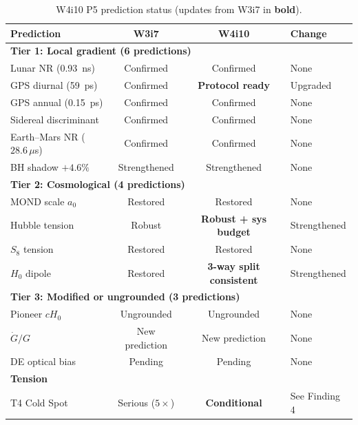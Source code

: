 \documentclass[11pt,a4paper]{article}
\newcommand{\Hzero}{H_0}
\newcommand{\aM}{a_0}
\begin{document}
\begin{table}[H]
\centering
\caption{W4i10 P5 prediction status (updates from W3i7 in \textbf{bold}).}
\begin{tabular}{p{3.5cm}ccl}
\toprule
\textbf{Prediction} & \textbf{W3i7} & \textbf{W4i10} & \textbf{Change} \\
\midrule
\multicolumn{4}{l}{\textbf{Tier 1: Local gradient (6 predictions)}} \\
\midrule
Lunar NR (0.93~ns) & Confirmed & Confirmed & None \\
GPS diurnal (59~ps) & Confirmed & \textbf{Protocol ready} & Upgraded \\
GPS annual (0.15~ps) & Confirmed & Confirmed & None \\
Sidereal discriminant & Confirmed & Confirmed & None \\
Earth--Mars NR ($28.6\,\mu$s) & Confirmed & Confirmed & None \\
BH shadow $+4.6\%$ & Strengthened & Strengthened & None \\
\midrule
\multicolumn{4}{l}{\textbf{Tier 2: Cosmological (4 predictions)}} \\
\midrule
MOND scale $\aM$ & Restored & Restored & None \\
Hubble tension & Robust & \textbf{Robust + sys budget} & Strengthened \\
$S_8$ tension & Restored & Restored & None \\
$\Hzero$ dipole & Restored & \textbf{3-way split consistent} & Strengthened \\
\midrule
\multicolumn{4}{l}{\textbf{Tier 3: Modified or ungrounded (3 predictions)}} \\
\midrule
Pioneer $c\Hzero$ & Ungrounded & Ungrounded & None \\
$\dot{G}/G$ & New prediction & New prediction & None \\
DE optical bias & Pending & Pending & None \\
\midrule
\multicolumn{4}{l}{\textbf{Tension}} \\
\midrule
T4 Cold Spot & Serious ($5\times$) & \textbf{Conditional} & See Finding 4 \\
\bottomrule
\end{tabular}
\end{table}
\end{document}
